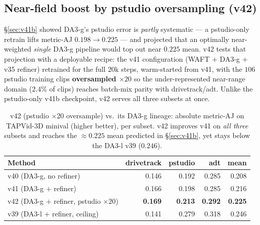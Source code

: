 \documentclass[11pt,a4paper]{article}
\begin{document}
\subsection{Near-field boost by pstudio oversampling (v42)}
\label{sec:v42}
\S\ref{sec:v41b} showed DA3-g's pstudio error is \emph{partly} systematic --- a pstudio-only retrain lifts
metric-AJ $0.198\!\to\!0.225$ --- and projected that an optimally near-weighted \emph{single} DA3-g pipeline
would top out near $0.225$ mean. v42 tests that projection with a deployable recipe: the v41 configuration
(WAFT $+$ DA3-g $+$ v35 refiner) retrained for the full $20$k steps, warm-started from v41, with the $106$
pstudio training clips \textbf{oversampled $\times20$} so the under-represented near-range domain ($2.4\%$ of
clips) reaches batch-mix parity with drivetrack/adt. Unlike the pstudio-only v41b checkpoint, v42 serves all
three subsets at once.

\begin{table}[h]
\centering
\caption{v42 (pstudio $\times20$ oversample) vs.\ its DA3-g lineage: absolute metric-AJ on TAPVid-3D
minival (higher better), per subset. v42 improves v41 on \emph{all three} subsets and reaches the
${\approx}0.225$ mean predicted in \S\ref{sec:v41b}, yet stays below the DA3-l v39 ($0.246$).}
\label{tab:v42}
\begin{tabular}{lrrrr}
\toprule
Method & drivetrack & pstudio & adt & mean \\
\midrule
v40 (DA3-g, no refiner)                     & 0.146 & 0.192 & 0.285 & 0.208 \\
v41 (DA3-g $+$ refiner)                     & 0.166 & 0.198 & 0.285 & 0.216 \\
v42 (DA3-g $+$ refiner, pstudio $\times20$) & \textbf{0.169} & \textbf{0.213} & \textbf{0.292} & \textbf{0.225} \\
\midrule
v39 (DA3-l $+$ refiner, ceiling)            & 0.141 & 0.279 & 0.318 & 0.246 \\
\bottomrule
\end{tabular}
\end{table}
\end{document}
